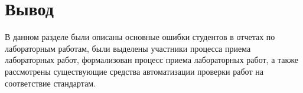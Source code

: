 \section*{Вывод}
В данном разделе были описаны основные ошибки студентов в отчетах по лабораторным работам, были выделены участники процесса приема лабораторных работ, формализован процесс приема лабораторных работ, а также рассмотрены существующие средства автоматизации проверки работ на соответствие стандартам.

